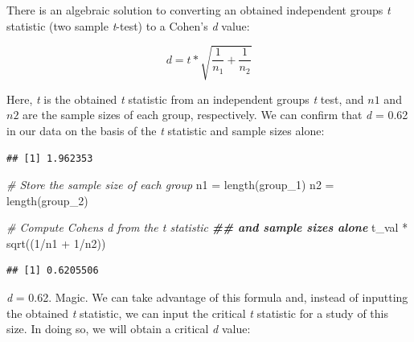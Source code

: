 \documentclass[
]{book}
\newenvironment{Shaded}{\begin{snugshade}}{\end{snugshade}}
\newcommand{\AttributeTok}[1]{\textcolor[rgb]{0.77,0.63,0.00}{#1}}
\newcommand{\CommentTok}[1]{\textcolor[rgb]{0.56,0.35,0.01}{\textit{#1}}}
\newcommand{\ConstantTok}[1]{\textcolor[rgb]{0.00,0.00,0.00}{#1}}
\newcommand{\DecValTok}[1]{\textcolor[rgb]{0.00,0.00,0.81}{#1}}
\newcommand{\DocumentationTok}[1]{\textcolor[rgb]{0.56,0.35,0.01}{\textbf{\textit{#1}}}}
\newcommand{\FunctionTok}[1]{\textcolor[rgb]{0.00,0.00,0.00}{#1}}
\newcommand{\NormalTok}[1]{#1}
\newcommand{\OtherTok}[1]{\textcolor[rgb]{0.56,0.35,0.01}{#1}}
\newcommand{\SpecialCharTok}[1]{\textcolor[rgb]{0.00,0.00,0.00}{#1}}
\begin{document}
There is an algebraic solution to converting an obtained independent groups \emph{t} statistic (two sample \emph{t}-test) to a Cohen's \emph{d} value:

\[d = t* \sqrt{\frac{1}{n_1} + \frac{1}{n_2}}\]

Here, \emph{t} is the obtained \emph{t} statistic from an independent groups \emph{t} test, and \(n1\) and \(n2\) are the sample sizes of each group, respectively. We can confirm that \emph{d} = 0.62 in our data on the basis of the \emph{t} statistic and sample sizes alone:

\begin{Shaded}
\end{Shaded}

\begin{verbatim}
## [1] 1.962353
\end{verbatim}

\begin{Shaded}
\begin{Highlighting}[]
\CommentTok{\# Store the sample size of each group}
\NormalTok{n1 }\OtherTok{=} \FunctionTok{length}\NormalTok{(group\_1)}
\NormalTok{n2 }\OtherTok{=} \FunctionTok{length}\NormalTok{(group\_2)}

\CommentTok{\# Compute Cohen\textquotesingle{}s d from the t statistic }
\DocumentationTok{\#\# and sample sizes alone}
\NormalTok{t\_val }\SpecialCharTok{*} \FunctionTok{sqrt}\NormalTok{((}\DecValTok{1}\SpecialCharTok{/}\NormalTok{n1 }\SpecialCharTok{+} \DecValTok{1}\SpecialCharTok{/}\NormalTok{n2))}
\end{Highlighting}
\end{Shaded}

\begin{verbatim}
## [1] 0.6205506
\end{verbatim}

\emph{d} = 0.62. Magic. We can take advantage of this formula and, instead of inputting the obtained \emph{t} statistic, we can input the critical \emph{t} statistic for a study of this size. In doing so, we will obtain a critical \emph{d} value:
\end{document}
